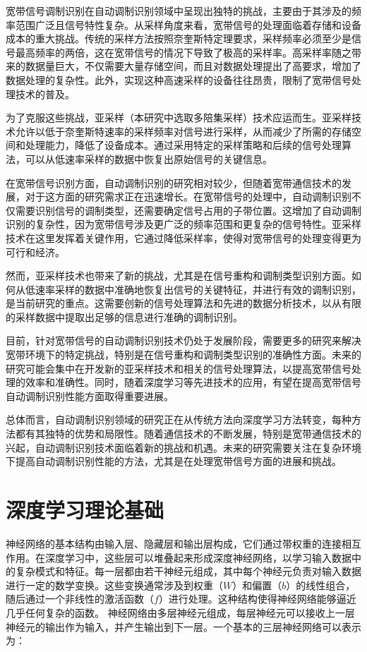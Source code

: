 宽带信号调制识别在自动调制识别领域中呈现出独特的挑战，主要由于其涉及的频率范围广泛且信号特性复杂。从采样角度来看，宽带信号的处理面临着存储和设备成本的重大挑战。传统的采样方法按照奈奎斯特定理要求，采样频率必须至少是信号最高频率的两倍，这在宽带信号的情况下导致了极高的采样率。高采样率随之带来的数据量巨大，不仅需要大量存储空间，而且对数据处理提出了高要求，增加了数据处理的复杂性。此外，实现这种高速采样的设备往往昂贵，限制了宽带信号处理技术的普及。

为了克服这些挑战，亚采样（本研究中选取多陪集采样）技术应运而生。亚采样技术允许以低于奈奎斯特速率的采样频率对信号进行采样，从而减少了所需的存储空间和处理能力，降低了设备成本。通过采用特定的采样策略和后续的信号处理算法，可以从低速率采样的数据中恢复出原始信号的关键信息。

在宽带信号识别方面，自动调制识别的研究相对较少，但随着宽带通信技术的发展，对于这方面的研究需求正在迅速增长。在宽带信号的处理中，自动调制识别不仅需要识别信号的调制类型，还需要确定信号占用的子带位置。这增加了自动调制识别的复杂性，因为宽带信号涉及更广泛的频率范围和更复杂的信号特性。亚采样技术在这里发挥着关键作用，它通过降低采样率，使得对宽带信号的处理变得更为可行和经济。

然而，亚采样技术也带来了新的挑战，尤其是在信号重构和调制类型识别方面。如何从低速率采样的数据中准确地恢复出信号的关键特征，并进行有效的调制识别，是当前研究的重点。这需要创新的信号处理算法和先进的数据分析技术，以从有限的采样数据中提取出足够的信息进行准确的调制识别。

目前，针对宽带信号的自动调制识别技术仍处于发展阶段，需要更多的研究来解决宽带环境下的特定挑战，特别是在信号重构和调制类型识别的准确性方面。未来的研究可能会集中在开发新的亚采样技术和相关的信号处理算法，以提高宽带信号处理的效率和准确性。同时，随着深度学习等先进技术的应用，有望在提高宽带信号自动调制识别性能方面取得重要进展。

总体而言，自动调制识别领域的研究正在从传统方法向深度学习方法转变，每种方法都有其独特的优势和局限性。随着通信技术的不断发展，特别是宽带通信技术的兴起，自动调制识别技术面临着新的挑战和机遇。未来的研究需要关注在复杂环境下提高自动调制识别性能的方法，尤其是在处理宽带信号方面的进展和挑战。


\section{深度学习理论基础}\label{sec:background}

神经网络的基本结构由输入层、隐藏层和输出层构成，它们通过带权重的连接相互作用。在深度学习中，这些层可以堆叠起来形成深度神经网络，以学习输入数据中的复杂模式和特征。每一层都由若干神经元组成，其中每个神经元负责对输入数据进行一定的数学变换。这些变换通常涉及到权重（\(W\)）和偏置（\(b\)）的线性组合，随后通过一个非线性的激活函数（\(f\)）进行处理。这种结构使得神经网络能够逼近几乎任何复杂的函数。
神经网络由多层神经元组成，每层神经元可以接收上一层神经元的输出作为输入，并产生输出到下一层。一个基本的三层神经网络可以表示为：

